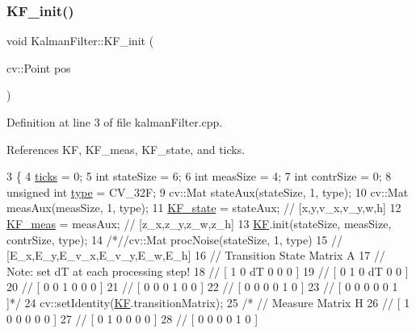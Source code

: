 \subsubsection{\texorpdfstring{K\+F\+\_\+init()}{KF\_init()}}
{\footnotesize\ttfamily void Kalman\+Filter\+::\+K\+F\+\_\+init (\begin{DoxyParamCaption}\item[{cv\+::\+Point}]{pos }\end{DoxyParamCaption})}



Definition at line 3 of file kalman\+Filter.\+cpp.



References KF, K\+F\+\_\+meas, K\+F\+\_\+state, and ticks.


\begin{DoxyCode}
3                                       \{
4     \hyperlink{class_kalman_filter_a9f9d6412ec56e87e78fe1de185bef4b8}{ticks} = 0;
5     \textcolor{keywordtype}{int} stateSize = 6;
6     \textcolor{keywordtype}{int} measSize = 4;
7     \textcolor{keywordtype}{int} contrSize = 0;
8     \textcolor{keywordtype}{unsigned} \textcolor{keywordtype}{int} \hyperlink{classstd_1_1conditional_1_1type}{type} = CV\_32F;
9     cv::Mat stateAux(stateSize, 1, type);
10     cv::Mat measAux(measSize, 1, type);
11     \hyperlink{class_kalman_filter_a279304db3b9574783b2724ab2ed989af}{KF\_state} = stateAux;  \textcolor{comment}{// [x,y,v\_x,v\_y,w,h]}
12     \hyperlink{class_kalman_filter_ab8ea794012f17385fead830634b1c1ed}{KF\_meas} = measAux;    \textcolor{comment}{// [z\_x,z\_y,z\_w,z\_h]}
13     \hyperlink{class_kalman_filter_a486d5802080222974f49454c59b71d83}{KF}.init(stateSize, measSize, contrSize, type);
14     \textcolor{comment}{/*//cv::Mat procNoise(stateSize, 1, type)}
15 \textcolor{comment}{    // [E\_x,E\_y,E\_v\_x,E\_v\_y,E\_w,E\_h]}
16 \textcolor{comment}{    // Transition State Matrix A}
17 \textcolor{comment}{    // Note: set dT at each processing step!}
18 \textcolor{comment}{    // [ 1 0 dT 0  0 0 ]}
19 \textcolor{comment}{    // [ 0 1 0  dT 0 0 ]}
20 \textcolor{comment}{    // [ 0 0 1  0  0 0 ]}
21 \textcolor{comment}{    // [ 0 0 0  1  0 0 ]}
22 \textcolor{comment}{    // [ 0 0 0  0  1 0 ]}
23 \textcolor{comment}{    // [ 0 0 0  0  0 1 ]*/}
24     cv::setIdentity(\hyperlink{class_kalman_filter_a486d5802080222974f49454c59b71d83}{KF}.transitionMatrix);
25     \textcolor{comment}{/* // Measure Matrix H}
26 \textcolor{comment}{    // [ 1 0 0 0 0 0 ]}
27 \textcolor{comment}{    // [ 0 1 0 0 0 0 ]}
28 \textcolor{comment}{    // [ 0 0 0 0 1 0 ]}

\end{DoxyCode}
